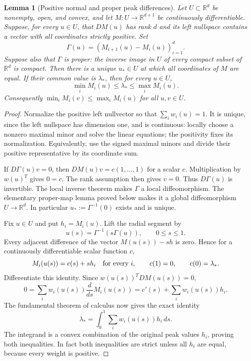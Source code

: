 \documentclass[11pt]{article}
\newcommand{\R}{\mathbb R}
\newtheorem{lemma}[theorem]{Lemma}
\theoremstyle{remark}
\numberwithin{equation}{section}
\begin{document}
\begin{lemma}[Positive normal and proper peak differences]
Let $U\subset\R^d$ be nonempty, open, and convex, and let
$M:U\to\R^{d+1}$ be continuously differentiable.  Suppose, for every
$u\in U$, that $DM(u)$ has rank $d$ and its left nullspace contains a
vector with all coordinates strictly positive.  Set
\[
 \Gamma(u)=(M_{i+1}(u)-M_i(u))_{i=1}^{d}.
\]
Suppose also that $\Gamma$ is proper: the inverse image in $U$ of
every compact subset of $\R^d$ is compact.  Then there is a unique
$u_*\in U$ at which all coordinates of $M$ are equal.  If their
common value is $\lambda_*$, then for every $u\in U$,
\[
 \min_i M_i(u)\le\lambda_*\le\max_i M_i(u).
\]
Consequently $\min_i M_i(v)\le\max_i M_i(u)$ for all $u,v\in U$.
\end{lemma}

\begin{proof}
Normalize the positive left nullvector so that
$\sum_i w_i(u)=1$.  It is unique, since the left nullspace has
dimension one, and is continuous: locally choose a nonzero maximal
minor and solve the linear equations; the positivity fixes its
normalization.  Equivalently, use the signed maximal minors and
divide their positive representative by its coordinate sum.

If $D\Gamma(u)v=0$, then $DM(u)v=c(1,\ldots,1)$ for a scalar $c$.
Multiplication by $w(u)^T$ gives $0=c$.  The rank assumption then
gives $v=0$.  Thus $D\Gamma(u)$ is invertible.  The local inverse
theorem makes $\Gamma$ a local diffeomorphism.  The elementary
proper-map lemma proved below makes it a global diffeomorphism
$U\to\R^d$.  In particular $u_*:=\Gamma^{-1}(0)$ exists and is unique.

Fix $u\in U$ and put $h_i=M_i(u)$.  Lift the radial segment by
\[
 u(s)=\Gamma^{-1}(s\Gamma(u)),\qquad 0\le s\le1.
\]
Every adjacent difference of the vector $M(u(s))-s h$ is zero.
Hence for a continuously differentiable scalar function $c$,
\[
 M_i(u(s))=c(s)+s h_i\quad\hbox{for every }i,
 \qquad c(1)=0,\qquad c(0)=\lambda_*.
\]
Differentiate this identity.  Since $w(u(s))^TDM(u(s))=0$,
\[
 0=\sum_iw_i(u(s))\frac{d}{ds}M_i(u(s))
   =c'(s)+\sum_iw_i(u(s))h_i.
\]
The fundamental theorem of calculus now gives the exact identity
\begin{equation}\label{polyretry:peak-average}
 \lambda_*=\int_0^1\sum_iw_i(u(s))h_i\,ds.
\end{equation}
The integrand is a convex combination of the original peak values
$h_i$, proving both inequalities.  In fact both inequalities are
strict unless all $h_i$ are equal, because every weight is positive.
\end{proof}
\end{document}
